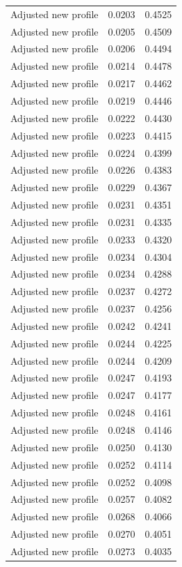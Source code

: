 \begin{table}[htbp]
\begin{tabular}{lll}
Adjusted new profile & 0.0203 & 0.4525 \\
Adjusted new profile & 0.0205 & 0.4509 \\
Adjusted new profile & 0.0206 & 0.4494 \\
Adjusted new profile & 0.0214 & 0.4478 \\
Adjusted new profile & 0.0217 & 0.4462 \\
Adjusted new profile & 0.0219 & 0.4446 \\
Adjusted new profile & 0.0222 & 0.4430 \\
Adjusted new profile & 0.0223 & 0.4415 \\
Adjusted new profile & 0.0224 & 0.4399 \\
Adjusted new profile & 0.0226 & 0.4383 \\
Adjusted new profile & 0.0229 & 0.4367 \\
Adjusted new profile & 0.0231 & 0.4351 \\
Adjusted new profile & 0.0231 & 0.4335 \\
Adjusted new profile & 0.0233 & 0.4320 \\
Adjusted new profile & 0.0234 & 0.4304 \\
Adjusted new profile & 0.0234 & 0.4288 \\
Adjusted new profile & 0.0237 & 0.4272 \\
Adjusted new profile & 0.0237 & 0.4256 \\
Adjusted new profile & 0.0242 & 0.4241 \\
Adjusted new profile & 0.0244 & 0.4225 \\
Adjusted new profile & 0.0244 & 0.4209 \\
Adjusted new profile & 0.0247 & 0.4193 \\
Adjusted new profile & 0.0247 & 0.4177 \\
Adjusted new profile & 0.0248 & 0.4161 \\
Adjusted new profile & 0.0248 & 0.4146 \\
Adjusted new profile & 0.0250 & 0.4130 \\
Adjusted new profile & 0.0252 & 0.4114 \\
Adjusted new profile & 0.0252 & 0.4098 \\
Adjusted new profile & 0.0257 & 0.4082 \\
Adjusted new profile & 0.0268 & 0.4066 \\
Adjusted new profile & 0.0270 & 0.4051 \\
Adjusted new profile & 0.0273 & 0.4035 \\

\end{tabular}
\end{table}
